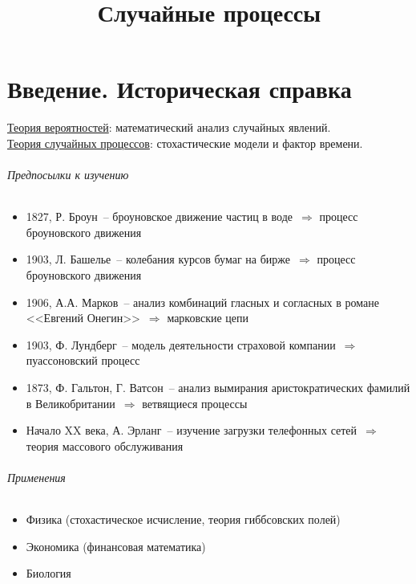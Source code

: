 

\title{Случайные процессы}



\maketitle
\tableofcontents

\newpage

\part*{Введение. Историческая справка}
\underline{Теория вероятностей}: математический анализ случайных явлений.\\
\underline{Теория случайных процессов}: стохастические модели и фактор времени.

\paragraph{Предпосылки к изучению}
\begin{itemize}
\item 1827, Р. Броун~-- броуновское движение частиц в воде~$\Rightarrow$ процесс броуновского движения
\item 1903, Л. Башелье~-- колебания курсов бумаг на бирже~$\Rightarrow$ процесс броуновского движения
\item 1906, А.А. Марков~-- анализ комбинаций гласных и согласных в романе <<Евгений Онегин>>~$\Rightarrow$ марковские цепи
\item 1903, Ф. Лундберг~-- модель деятельности страховой компании~$\Rightarrow$ пуассоновский процесс
\item 1873, Ф. Гальтон, Г. Ватсон~-- анализ вымирания аристократических фамилий в Великобритании~$\Rightarrow$ ветвящиеся процессы
\item Начало XX века, А. Эрланг~-- изучение загрузки телефонных сетей~$\Rightarrow$ теория массового обслуживания
\end{itemize}

\paragraph{Применения}
\begin{itemize}
\item Физика (стохастическое исчисление, теория гиббсовских полей)
\item Экономика (финансовая математика)
\item Биология
\end{itemize}

